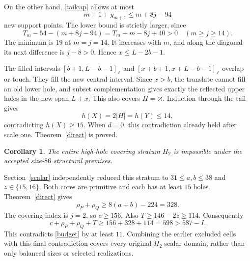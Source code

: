 \documentclass[11pt,a4paper]{article}
\newcommand{\Z}{\mathbb Z}
\newcommand{\ints}[2]{[#1,#2]_{\Z}}
\newtheorem{corollary}[theorem]{Corollary}
\begin{document}
On the other hand, \eqref{tailcap} allows at most
\[
m+1+y_{m+1}\le m+8j-94
\]
new support points. The lower bound is strictly larger, since
\[
T_m-54-(m+8j-94)=T_m-m-8j+40>0
\quad(m\ge j\ge14).
\]
The minimum is $19$ at $m=j=14$. It increases with $m$, and along the diagonal its next difference is $j-8>0$. Hence $x\le L-2b-1$.

The filled intervals $\ints{b+1}{L-b-1}$ and $\ints{x+b+1}{x+L-b-1}$ overlap or touch. They fill the new central interval. Since $x>b$, the translate cannot fill an old lower hole, and subset complementation gives exactly the reflected upper holes in the new span $L+x$. This also covers $H=\varnothing$. Induction through the tail gives
\[
h(X)=2|H|=h(Y)\le14,
\]
contradicting $h(X)\ge15$. When $d=0$, this contradiction already held after scale one. Theorem~\ref{direct} is proved.

\begin{corollary}
The entire high-hole covering stratum $H_2$ is impossible under the accepted size-$86$ structural premises.
\end{corollary}
Section~\ref{scalar} independently reduced this stratum to $31\le a,b\le38$ and $z\in\{15,16\}$. Both cores are primitive and each has at least $15$ holes. Theorem~\ref{direct} gives
\[
\rho_P+\rho_Q\ge8(a+b)-224=328.
\]
The covering index is $j=2$, so $c\ge156$. Also $T\ge146-2z\ge114$. Consequently
\[
\boxed{c+\rho_P+\rho_Q+T\ge156+328+114=598>587-I.}
\]
This contradicts \eqref{budget} by at least $11$. Combining the earlier excluded cells with this final contradiction covers every original $H_2$ scalar domain, rather than only balanced sizes or selected realizations.

\newpage
\end{document}
